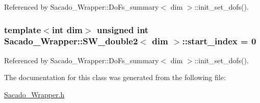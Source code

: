 Referenced by Sacado\+\_\+\+Wrapper\+::\+Do\+Fs\+\_\+summary$<$ dim $>$\+::init\+\_\+set\+\_\+dofs().

\subsubsection[{\texorpdfstring{start\+\_\+index}{start_index}}]{\setlength{\rightskip}{0pt plus 5cm}template$<$int dim$>$ unsigned {\bf int} {\bf Sacado\+\_\+\+Wrapper\+::\+S\+W\+\_\+double2}$<$ dim $>$\+::start\+\_\+index = 0}\hypertarget{classSacado__Wrapper_1_1SW__double2_ae7327540ad1fd725ea78ffc2268b423a}{}\label{classSacado__Wrapper_1_1SW__double2_ae7327540ad1fd725ea78ffc2268b423a}


Referenced by Sacado\+\_\+\+Wrapper\+::\+Do\+Fs\+\_\+summary$<$ dim $>$\+::init\+\_\+set\+\_\+dofs().



The documentation for this class was generated from the following file\+:\begin{DoxyCompactItemize}
\item 
\hyperlink{Sacado__Wrapper_8h}{Sacado\+\_\+\+Wrapper.\+h}\end{DoxyCompactItemize}
